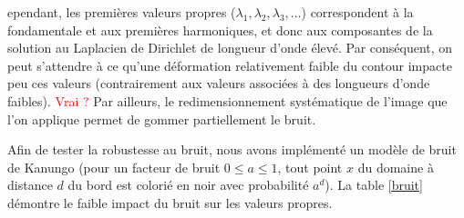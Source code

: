 \documentclass[a4paper,10pt]{article} %
\theoremstyle{definition} %
\begin{document}
ependant, les premières valeurs propres ($\lambda_1, \lambda_2, \lambda_3, \dots$) correspondent à la fondamentale et aux premières harmoniques, et donc aux composantes de la solution au Laplacien de Dirichlet de longueur d'onde élevé. Par conséquent, on peut s'attendre à ce qu'une déformation relativement faible du contour impacte peu ces valeurs (contrairement aux valeurs associées à des longueurs d'onde faibles). {\large \textcolor{red}{Vrai ?}} Par ailleurs, le redimensionnement systématique de l'image que l'on applique permet de gommer partiellement le bruit.

Afin de tester la robustesse au bruit, nous avons implémenté un modèle de bruit de Kanungo (pour un facteur de bruit $0 \leq a \leq 1$, tout point $x$ du domaine à distance $d$ du bord est colorié en noir avec probabilité $a^d$). La table \ref{bruit} démontre le faible impact du bruit sur les valeurs propres.
\end{document}
